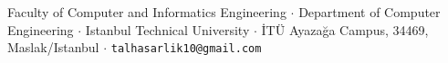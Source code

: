 \documentclass[portrait,a0b,final]{a0poster}
\begin{document}
\vspace{8mm}

\begin{tcolorbox}[enhanced, colback=ituBlue, colframe=ituBlue,
                  arc=2mm, boxrule=0pt, left=10mm, right=10mm,
                  top=3mm, bottom=3mm]
\centering\color{white}\large
Faculty of Computer and Informatics Engineering \quad$\cdot$\quad
Department of Computer Engineering \quad$\cdot$\quad
Istanbul Technical University \quad$\cdot$\quad
İTÜ Ayazağa Campus, 34469, Maslak/Istanbul \quad$\cdot$\quad
\texttt{talhasarlik10@gmail.com}
\end{tcolorbox}
\end{document}
